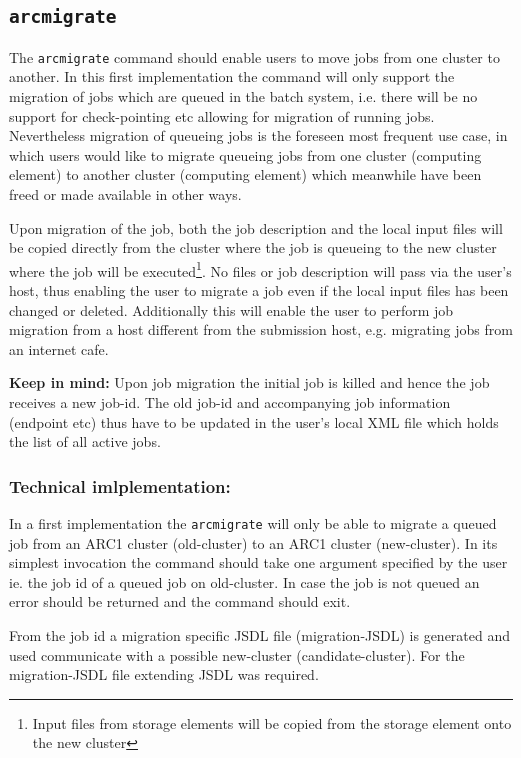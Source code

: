 \documentclass[11pt,oneside,a4paper,english]{article}
\newcommand{\arcmigrate}{\texttt{arcmigrate}\xspace}
\begin{document}
\subsection*{\arcmigrate}
The \arcmigrate command should enable users to move jobs from one cluster to another. In this first implementation the command will only support the migration of jobs which are queued in the batch system, i.e. there will be no support for check-pointing etc allowing for migration of running jobs. Nevertheless migration of queueing jobs is the foreseen most frequent use case, in which users would like to migrate queueing jobs from one cluster (computing element) to another cluster (computing element) which meanwhile have been freed or made available in other ways. 

Upon migration of the job, both the job description and the local input files will be copied directly from the cluster where the job is queueing to the new cluster where the job will be executed\footnote{Input files from storage elements will be copied from the storage element onto the new cluster}. No files or job description will pass via the user's host, thus enabling the user to migrate a job even if the local input files has been changed or deleted. Additionally this will enable the user to perform job migration from a host different from the submission host, e.g. migrating jobs from an internet cafe.

{\bf Keep in mind:} Upon job migration the initial job is killed and hence the job receives a new job-id. The old job-id and accompanying job information (endpoint etc) thus have to be updated in the user's local XML file which holds the list of all active jobs.


\subsubsection*{Technical imlplementation:}
In a first implementation the \arcmigrate will only be able to migrate a queued job from an ARC1 cluster (old-cluster) to an ARC1 cluster (new-cluster). In its simplest invocation the command should take one argument specified by the user ie. the job id of a queued job on old-cluster. In case the job is not queued an error should be returned and the command should exit.

From the job id a migration specific JSDL file (migration-JSDL) is generated and used communicate with a possible new-cluster (candidate-cluster). For the migration-JSDL file extending JSDL was required.
\end{document}

